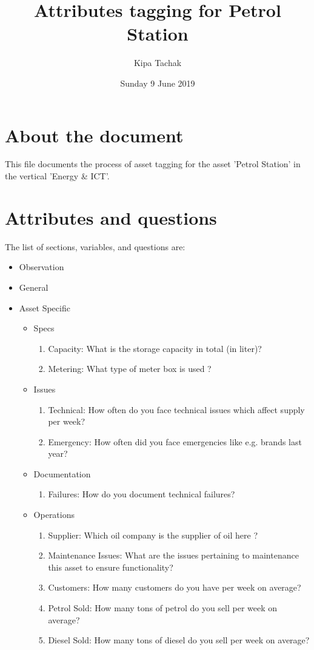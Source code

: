 \documentclass[oneside,twocolumn]{article}
\title{Attributes tagging for Petrol Station}
\author{Kipa Tachak}
\date{Sunday  9 June 2019}
\begin{document}
\maketitle

\section{About the document}
This file documents the process of asset tagging for the asset 'Petrol Station' in the
vertical 'Energy \& ICT'.

\section{Attributes and questions}
The list of sections, variables, and questions are:
    \begin{itemize}
    \item Observation
    \item General
    \item Asset Specific
    \begin{itemize}
\item Specs
\begin{enumerate}
\item Capacity: What is the storage capacity in total (in liter)?
\item Metering: What type of meter box is used ?
\end{enumerate}

\item Issues
\begin{enumerate}
\item Technical: How often do you face technical issues which affect supply per week?
\item Emergency: How often did you face emergencies like e.g. brands last year?
\end{enumerate}

\item Documentation
\begin{enumerate}
\item Failures: How do you document technical failures?
\end{enumerate}

\item Operations
\begin{enumerate}
\item Supplier: Which oil company is the supplier of oil here ?
\item Maintenance Issues: What are the issues pertaining to maintenance this asset to ensure functionality?
\item Customers: How many customers do you have per week on average?
\item Petrol Sold: How many tons of petrol do you sell per week on average?
\item Diesel Sold: How many tons of diesel do you sell per week on average?
\end{enumerate}


\end{itemize}
\end{itemize}
\end{document}
